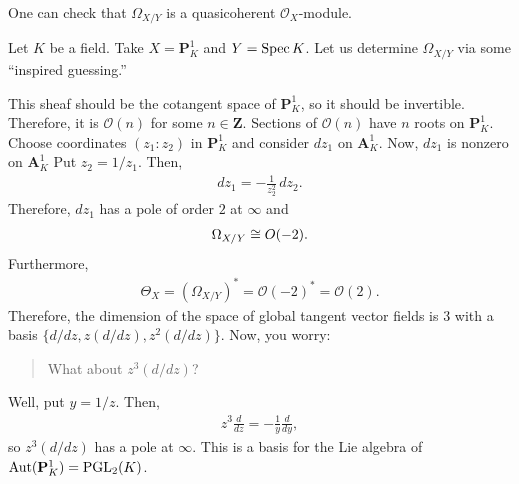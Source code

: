 \documentclass [11 pt, oneside] {article}
\begin{document}
One can check that $\Omega_{X/Y}$ is a quasicoherent $\mathscr{O}_X$-module.

\begin{example}[ ]\label{}\text{}
Let $K$ be a field. Take $X = \mathbf{P}^1_K$ and $Y = \operatorname{Spec} K$. Let us determine $\Omega_{X/Y}$ via some ``inspired guessing.''

This sheaf should be the cotangent space of $\mathbf{P}^1_K$, so it should be invertible. Therefore, it is $\mathscr{O}(n)$ for some $n\in \mathbf{Z}$.
Sections of $\mathscr{O}(n)$ have $n$ roots on $\mathbf{P}^1_K$. Choose coordinates $(z_1:z_2)$ in $\mathbf{P}^1_K$ and consider $dz_1$ on $\mathbf{A}^1_K$. Now, $dz_1$ is nonzero on $\mathbf{A}^1_K$
Put $z_2=1/z_1$. Then,
\begin{align*}
	dz_1 = -\frac{1}{z_2^2}\,dz_2.
\end{align*}
Therefore, $dz_1$ has a pole of order $2$ at $\infty$ and 
\begin{align*}
	\Omega_{X/Y}\cong \relax{O}(-2).
\end{align*}
Furthermore,
\begin{align*}
	\Theta_X = (\Omega_{X/Y})^* =  \mathscr{O}(-2) ^* = \mathscr{O}(2).
\end{align*}
Therefore, the dimension of the space of global tangent vector fields is $3$ with a basis $\{d/dz, z(d/dz), z^2 (d/dz)\}$. Now, you worry:
\begin{quote}
	\small What about $z^3(d/dz)$?
\end{quote}
Well, put $y = 1/z$. Then, 
\begin{align*}
	z^3 \frac{d}{dz} = -\frac{1}{y}\frac{d}{dy},
\end{align*}
so $z^3(d/dz)$ has a pole at $\infty$.
This is a basis for the Lie algebra of $\operatorname{Aut}(\mathbf{P}^1_K)=\operatorname{PGL}_{2}(K)$.
\end{example}
\end{document}

